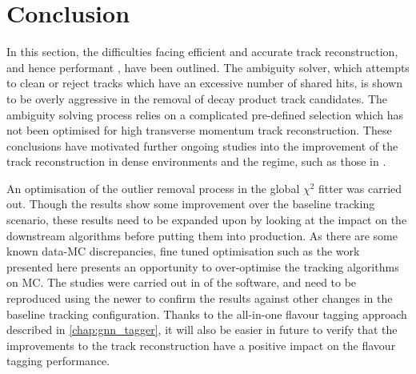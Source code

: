 \section{Conclusion}

In this section, the difficulties facing efficient and accurate  track reconstruction, and hence performant \btagging, have been outlined.
The ambiguity solver, which attempts to clean or reject tracks which have an excessive number of shared hits, is shown to be overly aggressive in the removal of \bhadron decay product track candidates.
The ambiguity solving process relies on a complicated pre-defined selection which has not been optimised for high transverse momentum \bhadron track reconstruction.
These conclusions have motivated further ongoing studies into the improvement of the track reconstruction in dense environments and the \highpt regime, such as those in .

An optimisation of the outlier removal process in the global $\chi^2$ fitter was carried out.
Though the results show some improvement over the baseline tracking scenario, these results need to be expanded upon by looking at the impact on the downstream \btagging algorithms before putting them into production.
As there are some known data-MC discrepancies, fine tuned optimisation such as the work presented here presents an opportunity to over-optimise the tracking algorithms on MC.
The studies were carried out in \rtwoone of the \ATLAS software, and need to be reproduced using the newer \rtwotwo to confirm the results against other changes in the baseline tracking configuration.
Thanks to the all-in-one flavour tagging approach described in \cref{chap:gnn_tagger}, it will also be easier in future to verify that the improvements to the track reconstruction have a positive impact on the flavour tagging performance.
